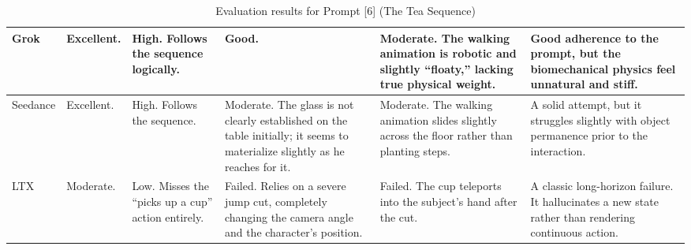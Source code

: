 \documentclass[sigconf]{acmart}
\begin{document}
\begin{table}[H]
\begin{tabularx}{\textwidth}{| l | >{\raggedright\arraybackslash}X | >{\raggedright\arraybackslash}X | >{\raggedright\arraybackslash}X | >{\raggedright\arraybackslash}X | >{\raggedright\arraybackslash}X |}
        Grok           & Excellent.                          & High. Follows the sequence logically.                                                   & Good.                                                                                                                         & Moderate. The walking animation is robotic and slightly ``floaty,'' lacking true physical weight.                      & Good adherence to the prompt, but the biomechanical physics feel unnatural and stiff.                                                        \\ \hline
        Seedance       & Excellent.                          & High. Follows the sequence.                                                             & Moderate. The glass is not clearly established on the table initially; it seems to materialize slightly as he reaches for it. & Moderate. The walking animation slides slightly across the floor rather than planting steps.                           & A solid attempt, but it struggles slightly with object permanence prior to the interaction.                                                  \\ \hline
        LTX            & Moderate.                           & Low. Misses the ``picks up a cup'' action entirely.                                     & Failed. Relies on a severe jump cut, completely changing the camera angle and the character's position.                       & Failed. The cup teleports into the subject's hand after the cut.                                                       & A classic long-horizon failure. It hallucinates a new state rather than rendering continuous action.                                         \\ \hline
    \end{tabularx}
    \caption{Evaluation results for Prompt [6] (The Tea Sequence)}
    \label{tab:cupoftea}
\end{table}
\end{document}
